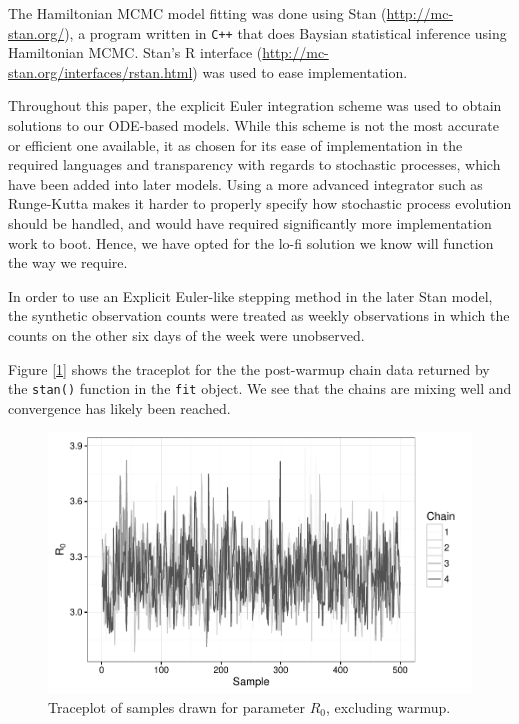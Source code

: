     The Hamiltonian MCMC model fitting was done using Stan (\url{http://mc-stan.org/}), a program written in \verb|C++| that does Baysian statistical inference using Hamiltonian MCMC. Stan's R interface (\url{http://mc-stan.org/interfaces/rstan.html}) was used to ease implementation.

    Throughout this paper, the explicit Euler integration scheme was used to obtain solutions to our ODE-based models. While this scheme is not the most accurate or efficient one available, it as chosen for its ease of implementation in the required languages and transparency with regards to stochastic processes, which have been added into later models. Using a more advanced integrator such as Runge-Kutta makes it harder to properly specify how stochastic process evolution should be handled, and would have required significantly more implementation work to boot. Hence, we have opted for the lo-fi solution we know will function the way we require.

    In order to use an Explicit Euler-like stepping method in the later Stan model, the synthetic observation counts were treated as weekly observations in which the counts on the other six days of the week were unobserved.

    Figure [\ref{traceplot}] shows the traceplot for the the post-warmup chain data returned by the \verb|stan()| function in the \verb|fit| object. We see that the chains are mixing well and convergence has likely been reached.

    \begin{figure}
        \centering
        \captionsetup{width=0.8\linewidth}
        \includegraphics[width=\textwidth]{./images/traceplotR0.pdf}
        \caption{Traceplot of samples drawn for parameter $R_0$, excluding warmup. \label{traceplot}}
    \end{figure}

